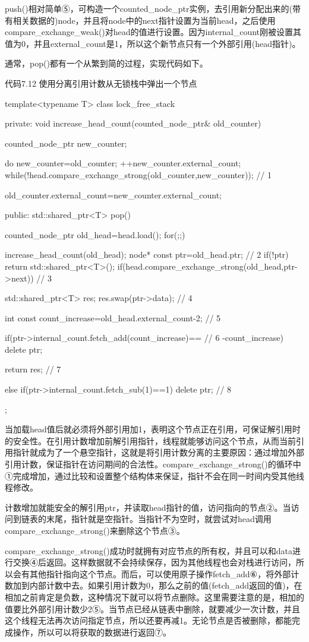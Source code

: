 push()相对简单⑤，可构造一个counted\_node\_ptr实例，去引用新分配出来的(带有相关数据的)node，并且将node中的next指针设置为当前head，之后使用compare\_exchange\_weak()对head的值进行设置。因为internal\_count刚被设置其值为0，并且external\_count是1，所以这个新节点只有一个外部引用(head指针)。

通常，pop()都有一个从繁到简的过程，实现代码如下。

代码7.12 使用分离引用计数从无锁栈中弹出一个节点

\begin{cpp}
template<typename T>
class lock_free_stack
{
private:
  void increase_head_count(counted_node_ptr& old_counter)
  {
    counted_node_ptr new_counter;

    do
    {
      new_counter=old_counter;
      ++new_counter.external_count;
    }
    while(!head.compare_exchange_strong(old_counter,new_counter));  // 1

    old_counter.external_count=new_counter.external_count;
  }
public:
  std::shared_ptr<T> pop()
  {
    counted_node_ptr old_head=head.load();
    for(;;)
    {
      increase_head_count(old_head);
      node* const ptr=old_head.ptr;  // 2
      if(!ptr)
      {
        return std::shared_ptr<T>();
      }
      if(head.compare_exchange_strong(old_head,ptr->next))  // 3
      {
        std::shared_ptr<T> res;
        res.swap(ptr->data);  // 4

        int const count_increase=old_head.external_count-2;  // 5

        if(ptr->internal_count.fetch_add(count_increase)==  // 6
           -count_increase)
        {
          delete ptr;
        }

        return res;  // 7
      }
      else if(ptr->internal_count.fetch_sub(1)==1)
      {
        delete ptr;  // 8
      }
    }
  }
};
\end{cpp}

当加载head值后就必须将外部引用加1，表明这个节点正在引用，可保证解引用时的安全性。在引用计数增加前解引用指针，线程就能够访问这个节点，从而当前引用指针就成为了一个悬空指针，这就是将引用计数分离的主要原因：通过增加外部引用计数，保证指针在访问期间的合法性。compare\_exchange\_strong()的循环中①完成增加，通过比较和设置整个结构体来保证，指针不会在同一时间内受其他线程修改。

计数增加就能安全的解引用ptr，并读取head指针的值，访问指向的节点②。当访问到链表的末尾，指针就是空指针。当指针不为空时，就尝试对head调用compare\_exchange\_strong()来删除这个节点③。

compare\_exchange\_strong()成功时就拥有对应节点的所有权，并且可以和data进行交换④后返回。这样数据就不会持续保存，因为其他线程也会对栈进行访问，所以会有其他指针指向这个节点。而后，可以使用原子操作fetch\_add⑥，将外部计数加到内部计数中去。如果引用计数为0，那么之前的值(fetch\_add返回的值)，在相加之前肯定是负数，这种情况下就可以将节点删除。这里需要注意的是，相加的值要比外部引用计数少2⑤。当节点已经从链表中删除，就要减少一次计数，并且这个线程无法再次访问指定节点，所以还要再减1。无论节点是否被删除，都能完成操作，所以可以将获取的数据进行返回⑦。

